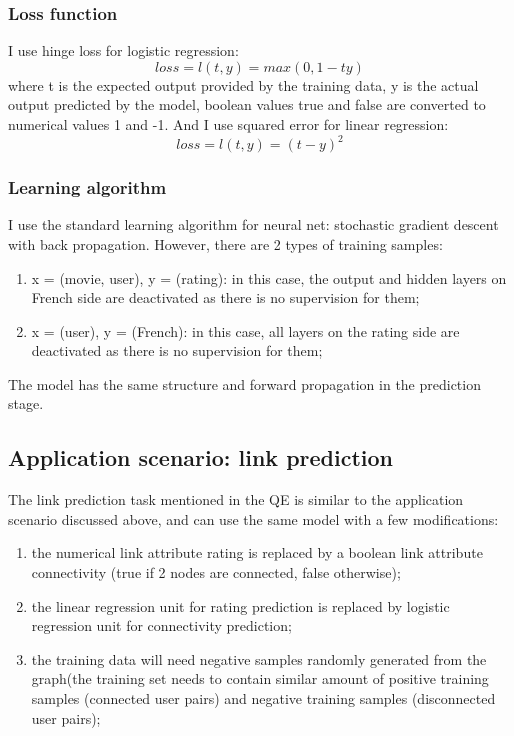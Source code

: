 \documentclass{article}
\begin{document}
\subsubsection{Loss function}
I use hinge loss for logistic regression:
\begin{equation}
loss = l(t, y) = max(0, 1 - ty)
\end{equation}
where t is the expected output provided by the training data, y is the actual output predicted by the model, boolean values true and false are converted to numerical values 1 and -1. And I use squared error for linear regression:
\begin{equation}
	loss = l(t, y) = (t - y)^2
\end{equation}

\subsubsection{Learning algorithm}
I use the standard learning algorithm for neural net: stochastic gradient descent with back propagation. However, there are 2 types of training samples:
\begin{enumerate}
	\item x = (movie, user), y = (rating): in this case, the output and hidden layers on French side are deactivated as there is no supervision for them;
	\item x = (user), y = (French): in this case, all layers on the rating side are deactivated as there is no supervision for them;
\end{enumerate}
The model has the same structure and forward propagation in the prediction stage.

\subsection{Application scenario: link prediction}
The link prediction task mentioned in the QE is similar to the application scenario discussed above, and can use the same model with a few modifications:
\begin{enumerate}
	\item the numerical link attribute rating is replaced by a boolean link attribute connectivity (true if 2 nodes are connected, false otherwise);
	\item the linear regression unit for rating prediction is replaced by logistic regression unit for connectivity prediction;
	\item the training data will need negative samples randomly generated from the graph(the training set needs to contain similar amount of positive training samples (connected user pairs) and negative training samples (disconnected user pairs);
\end{enumerate}
\end{document}
